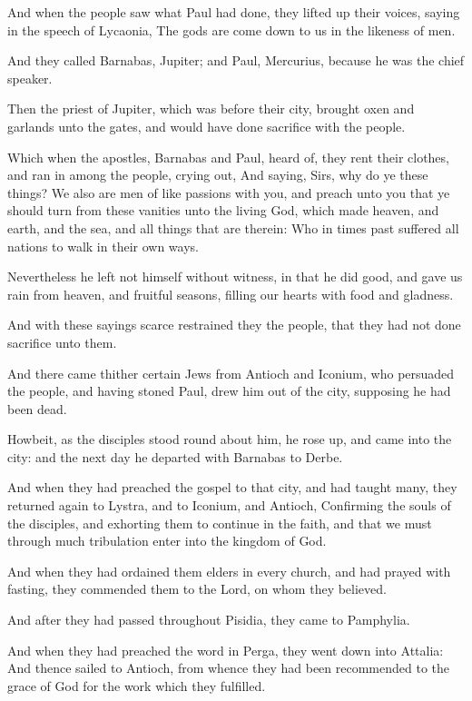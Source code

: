 \verse And when the people saw what Paul had done, they lifted up their voices, saying in the speech of Lycaonia, The gods are come down to us in the likeness of men.

\verse And they called Barnabas, Jupiter; and Paul, Mercurius, because he was the chief speaker.

\verse Then the priest of Jupiter, which was before their city, brought oxen and garlands unto the gates, and would have done sacrifice with the people.

\verse Which when the apostles, Barnabas and Paul, heard of, they rent their clothes, and ran in among the people, crying out, \verse And saying, Sirs, why do ye these things? We also are men of like passions with you, and preach unto you that ye should turn from these vanities unto the living God, which made heaven, and earth, and the sea, and all things that are therein: \verse Who in times past suffered all nations to walk in their own ways.

\verse Nevertheless he left not himself without witness, in that he did good, and gave us rain from heaven, and fruitful seasons, filling our hearts with food and gladness.

\verse And with these sayings scarce restrained they the people, that they had not done sacrifice unto them.

\verse And there came thither certain Jews from Antioch and Iconium, who persuaded the people, and having stoned Paul, drew him out of the city, supposing he had been dead.

\verse Howbeit, as the disciples stood round about him, he rose up, and came into the city: and the next day he departed with Barnabas to Derbe.

\verse And when they had preached the gospel to that city, and had taught many, they returned again to Lystra, and to Iconium, and Antioch, \verse Confirming the souls of the disciples, and exhorting them to continue in the faith, and that we must through much tribulation enter into the kingdom of God.

\verse And when they had ordained them elders in every church, and had prayed with fasting, they commended them to the Lord, on whom they believed.

\verse And after they had passed throughout Pisidia, they came to Pamphylia.

\verse And when they had preached the word in Perga, they went down into Attalia: \verse And thence sailed to Antioch, from whence they had been recommended to the grace of God for the work which they fulfilled.

